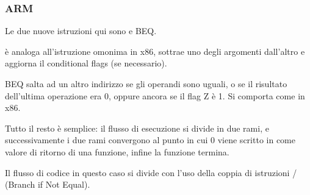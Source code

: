 \subsubsection{ARM}





Le due nuove istruzioni qui sono \CMP e \ac{BEQ}.

\CMP è analoga all'istruzione omonima in x86, sottrae uno degli argomenti dall'altro e aggiorna il conditional flags (se necessario).

\ac{BEQ} salta ad un altro indirizzo se gli operandi sono uguali, o se il risultato dell'ultima operazione era 0, oppure ancora se il flag Z è 1.
Si comporta come \JZ in x86.

Tutto il resto è semplice: il flusso di esecuzione si divide in due rami, e successivamente i due rami convergono al punto in cui 0 viene scritto in 
 come valore di ritorno di una funzione, infine la funzione termina.




Il flusso di codice in questo caso si divide con l'uso della coppia di istruzioni / (Branch if Not Equal).

